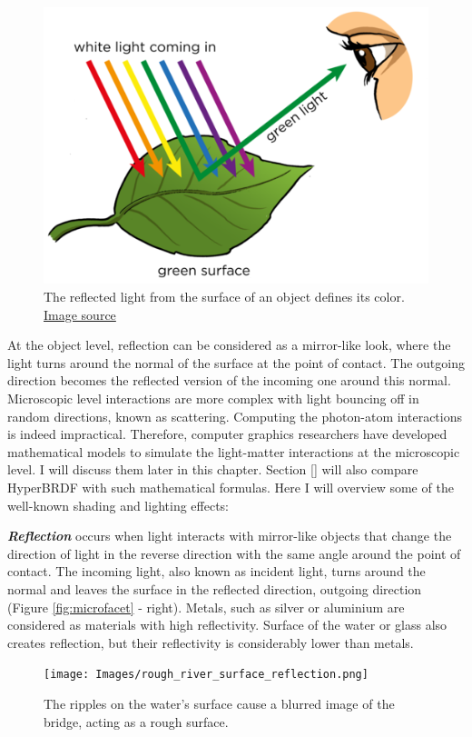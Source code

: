 \begin{figure}
  \centering
   \includegraphics[width=0.5\linewidth]{Images/object-color.png}
   \caption{The reflected light from the surface of an object defines its color. \href{http://www.mstworkbooks.co.za/natural-sciences/gr8/images/gr8ec04-gd-0027.png}{Image source}}
   \label{fig:object-color}
\end{figure}



At the object level, reflection can be considered as a mirror-like look, where the light turns around the normal of the surface at the point of contact. The outgoing direction becomes the reflected version of the incoming one around this normal. Microscopic level interactions are more complex with light bouncing off in random directions, known as scattering. Computing the photon-atom interactions is indeed impractical. Therefore, computer graphics researchers have developed mathematical models to simulate the light-matter interactions at the microscopic level. I will discuss them later in this chapter. Section \ref{} will also compare HyperBRDF with such mathematical formulas. Here I will overview some of the well-known shading and lighting effects:

\textbf{\textit{Reflection}} occurs when light interacts with mirror-like objects that change the direction of light in the reverse direction with the same angle around the point of contact. The incoming light, also known as incident light, turns around the normal and leaves the surface in the reflected direction, outgoing direction (Figure \ref{fig:microfacet} - right). Metals, such as silver or aluminium are considered as materials with high reflectivity. Surface of the water or glass also creates reflection, but their reflectivity is considerably lower than metals.

\begin{figure}
\texttt{[image: Images/rough\_river\_surface\_reflection.png]}
\caption{The ripples on the water's surface cause a blurred image of the bridge, acting as a rough surface.}\label{fig:water_reflection}
    
\end{figure} 

